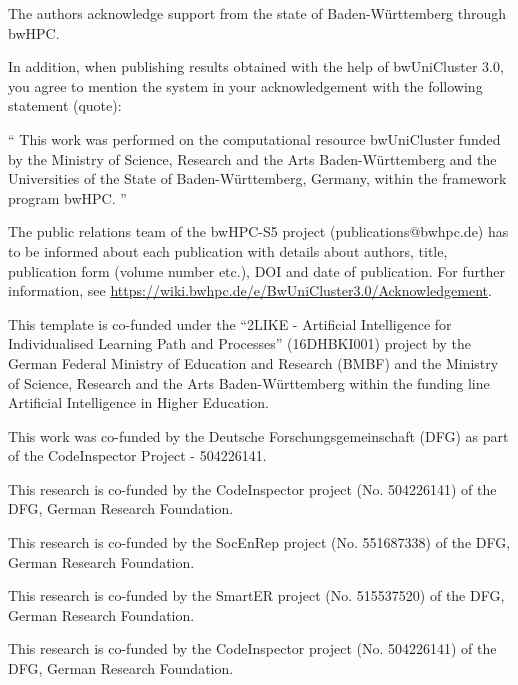 \documentclass[sigconf, review, nonacm]{acmart}
\begin{document}
\begin{acks}

The authors acknowledge support from the state of Baden-Württemberg through bwHPC.



In addition, when publishing results obtained with the help of bwUniCluster 3.0, you agree to mention the system in your acknowledgement with the following statement (quote):

``
This work was performed on the computational resource bwUniCluster funded by the Ministry of Science, Research and the Arts Baden-Württemberg and the Universities of the State of Baden-Württemberg, Germany, within the framework program bwHPC.
''

The public relations team of the bwHPC-S5 project (publications@bwhpc.de) has to be informed about each publication with details about authors, title, publication form (volume number etc.), DOI and date of publication. 
For further information, see \url{https://wiki.bwhpc.de/e/BwUniCluster3.0/Acknowledgement}.


This template is co-funded under the ``2LIKE - Artificial Intelligence for Individualised Learning Path and Processes'' (16DHBKI001)  project by the German Federal Ministry of Education and Research (BMBF) and the Ministry of Science, Research and the Arts Baden-Württemberg within the funding line Artificial Intelligence in Higher Education. 

\mysupervisorrole



This work was co-funded by the Deutsche Forschungsgemeinschaft (DFG) as part of the
CodeInspector Project - 504226141.

This research is co-funded by the CodeInspector project (No. 504226141) of the DFG, German Research Foundation.

This research is co-funded by the SocEnRep project (No. 551687338) of the DFG, German Research Foundation.

This research is co-funded by the SmartER project (No.
515537520) of the DFG, German Research Foundation.

This research is co-funded by the CodeInspector project (No. 504226141) of the DFG, German Research Foundation.

\end{acks}
\end{document}
